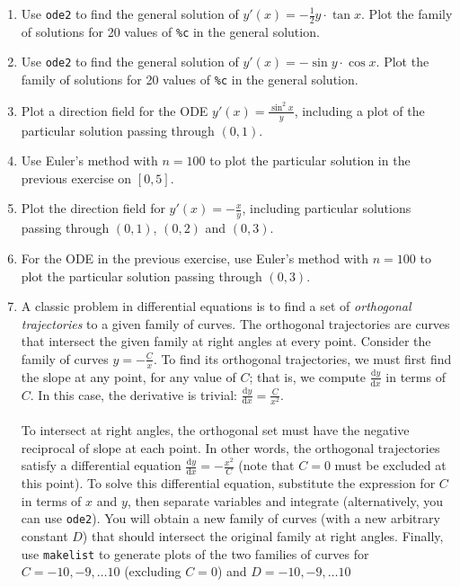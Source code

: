 \documentclass[10.5pt,twoside]{report}
\theoremstyle{definition}
\begin{document}
\begin{enumerate}
\item  Use \verb|ode2| to find the general solution of $y'(x)=-\frac{1}{2}y\cdot \tan{x}$.  Plot the family of solutions for 20 values of \verb|%c| in the general solution.

\item  Use \verb|ode2| to find the general solution of $y'(x)=-\sin{y}\cdot \cos{x}$.  Plot the family of solutions for 20 values of \verb|%c| in the general solution.

\item  Plot a direction field for the ODE $y'(x)=\frac{\sin^2{x}}{y}$, including a plot of the particular solution passing through $(0,1)$.

\item  Use Euler's method with $n=100$ to plot the particular solution in the previous exercise on $[0,5]$.

\item  Plot the direction field for $y'(x)=-\frac{x}{y}$, including particular solutions passing through $(0,1)$, $(0,2)$ and $(0,3)$.  

\item  For the ODE in the previous exercise, use Euler's method with $n=100$ to plot the particular solution passing through $(0,3)$.


\item  A classic problem in differential equations is to find a set of \textit{orthogonal trajectories} to a given family of curves.  The orthogonal trajectories are curves that intersect the given family at right angles at every point.  Consider the family of curves $y=-\frac{C}{x}$.  To find its orthogonal trajectories, we must first find the slope at any point, for any value of $C$; that is, we compute $\frac{\mathrm{d}y}{\mathrm{d}x}$ in terms of $C$.  In this case, the derivative is trivial:  $\frac{\mathrm{d}y}{\mathrm{d}x} = \frac{C}{x^2}$.\\
${}$\\
To intersect at right angles, the orthogonal set must have the negative reciprocal of slope at each point.  In other words, the orthogonal trajectories satisfy a differential equation $\frac{\mathrm{d}y}{\mathrm{d}x}= -\frac{x^2}{C}$ (note that $C=0$ must be excluded at this point).  To solve this differential equation, substitute the expression for $C$ in terms of $x$ and $y$, then separate variables and integrate (alternatively, you can use \verb|ode2|). You will obtain a new family of curves (with a new arbitrary constant $D$) that should intersect the original family at right angles.  Finally, use \verb|makelist| to generate plots of the two families of curves for $C=-10,-9,\dots 10$ (excluding $C=0$) and $D=-10,-9,\dots 10$


\end{enumerate}
\end{document}
